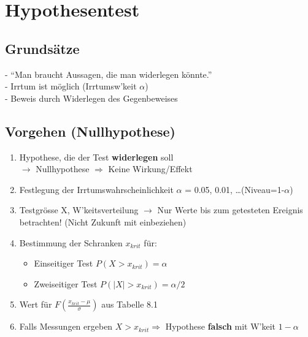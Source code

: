 \section{Hypothesentest }
	\subsection{Grundsätze}
	- ``Man braucht Aussagen, die man widerlegen könnte.''\\
	- Irrtum ist möglich (Irrtumsw'keit $\alpha$)\\
	- Beweis durch Widerlegen des Gegenbeweises
	\subsection{Vorgehen (Nullhypothese)}
	\begin{enumerate}
      \item Hypothese, die der Test \textbf{widerlegen} soll\\
      	$\rightarrow$ Nullhypothese $\Rightarrow$ Keine Wirkung/Effekt
      \item Festlegung der Irrtumswahrscheinlichkeit 	$\alpha$ = 0.05, 0.01, \ldots (Niveau=1-$\alpha$)
      \item Testgrösse X, W'keitsverteilung
      	$\rightarrow$ Nur Werte bis zum getesteten Ereignis betrachten! (Nicht Zukunft mit einbeziehen)
      \item Bestimmung der Schranken $x_{krit}$ für: 		
      	\begin{itemize}
      		\item Einseitiger Test $P(X > x_{krit})=\alpha$
      		\item Zweiseitiger Test $P(|X| > x_{krit})=\alpha/2$
      	\end{itemize}
      \item Wert für $F\!\left({\frac{x_{krit}-\mu}{\sigma}}\right)$ aus Tabelle 8.1
      \item Falls Messungen ergeben $X > x_{krit} \Longrightarrow$ Hypothese
      \textbf{falsch} mit W'keit $1-\alpha$
    \end{enumerate}
    
    
